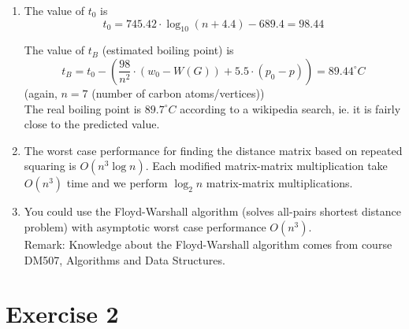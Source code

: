 \documentclass{article}
\begin{document}
\begin{enumerate}[label = (\arabic*)]
	\item The value of $t_0$ is
	\[
		t_0 = 745.42\cdot \log_{10}(n+4.4) - 689.4 = 98.44
	\]
	
	The value of $t_B$ (estimated boiling point) is
	\[
		t_B = t_0 - \left(\frac{98}{n^2}\cdot \left(w_0-W(G)\right)+5.5\cdot(p_0-p)\right) = 89.44^\circ C
	\]
	(again, $n=7$ (number of carbon atoms/vertices))\\
	
	The real boiling point is $89.7^\circ C$ according to a wikipedia search, ie. it is fairly close to the predicted value.
	
	
	\item The worst case performance for finding the distance matrix based on repeated squaring is $O(n^3\log n)$. Each modified matrix-matrix multiplication take $O(n^3)$ time and we perform $\log_2 n$ matrix-matrix multiplications.
	
	\item You could use the Floyd-Warshall algorithm (solves all-pairs shortest distance problem) with asymptotic worst case performance $O(n^3)$.\\
	

	\noindent Remark: Knowledge about the Floyd-Warshall algorithm
        comes from course DM507, Algorithms and Data Structures.
\end{enumerate}

\section*{Exercise 2}
\end{document}
